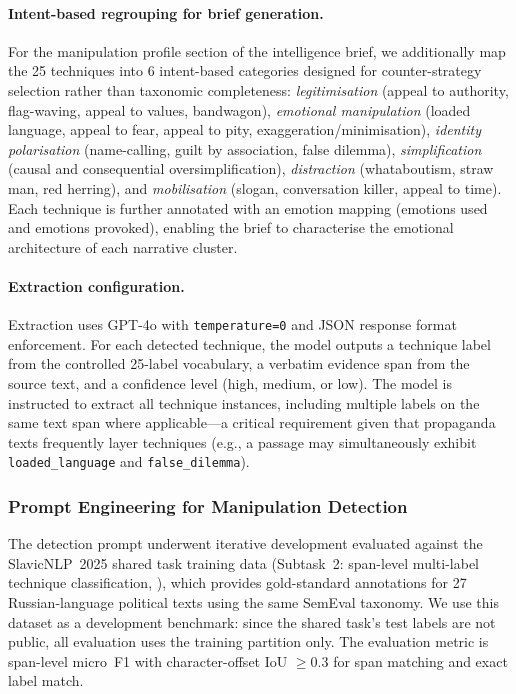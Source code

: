 \documentclass[10pt, a4paper]{article}
\begin{document}
\paragraph{Intent-based regrouping for brief generation.}
For the manipulation profile section of the intelligence brief, we additionally map the 25 techniques into 6 intent-based categories designed for counter-strategy selection rather than taxonomic completeness: \textit{legitimisation} (appeal to authority, flag-waving, appeal to values, bandwagon), \textit{emotional manipulation} (loaded language, appeal to fear, appeal to pity, exaggeration/minimisation), \textit{identity polarisation} (name-calling, guilt by association, false dilemma), \textit{simplification} (causal and consequential oversimplification), \textit{distraction} (whataboutism, straw man, red herring), and \textit{mobilisation} (slogan, conversation killer, appeal to time). Each technique is further annotated with an emotion mapping (emotions used and emotions provoked), enabling the brief to characterise the emotional architecture of each narrative cluster.

\paragraph{Extraction configuration.}
Extraction uses GPT-4o with \texttt{temperature=0} and JSON response format enforcement. For each detected technique, the model outputs a technique label from the controlled 25-label vocabulary, a verbatim evidence span from the source text, and a confidence level (high, medium, or low). The model is instructed to extract all technique instances, including multiple labels on the same text span where applicable---a critical requirement given that propaganda texts frequently layer techniques (e.g., a passage may simultaneously exhibit \texttt{loaded\_language} and \texttt{false\_dilemma}).


\subsubsection{Prompt Engineering for Manipulation Detection}
\label{sec:manipulation_prompt}

The detection prompt underwent iterative development evaluated against the SlavicNLP~2025 shared task training data (Subtask~2: span-level multi-label technique classification, \citep{piskorski2025proceedings}), which provides gold-standard annotations for 27 Russian-language political texts using the same SemEval taxonomy. We use this dataset as a development benchmark: since the shared task's test labels are not public, all evaluation uses the training partition only. The evaluation metric is span-level micro~F1 with character-offset IoU $\geq 0.3$ for span matching and exact label match.
\end{document}
